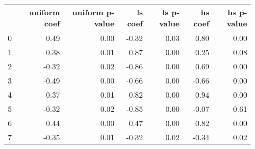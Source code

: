 \begin{tabular}{lrrrrrr}
\toprule
 & uniform coef & uniform p-value & ls coef & ls p-value & hs coef & hs p-value \\
\midrule
0 & 0.49 & 0.00 & -0.32 & 0.03 & 0.80 & 0.00 \\
1 & 0.38 & 0.01 & 0.87 & 0.00 & 0.25 & 0.08 \\
2 & -0.32 & 0.02 & -0.86 & 0.00 & 0.69 & 0.00 \\
3 & -0.49 & 0.00 & -0.66 & 0.00 & -0.66 & 0.00 \\
4 & -0.37 & 0.01 & -0.82 & 0.00 & 0.94 & 0.00 \\
5 & -0.32 & 0.02 & -0.85 & 0.00 & -0.07 & 0.61 \\
6 & 0.44 & 0.00 & 0.47 & 0.00 & 0.82 & 0.00 \\
7 & -0.35 & 0.01 & -0.32 & 0.02 & -0.34 & 0.02 \\
\bottomrule
\end{tabular}

